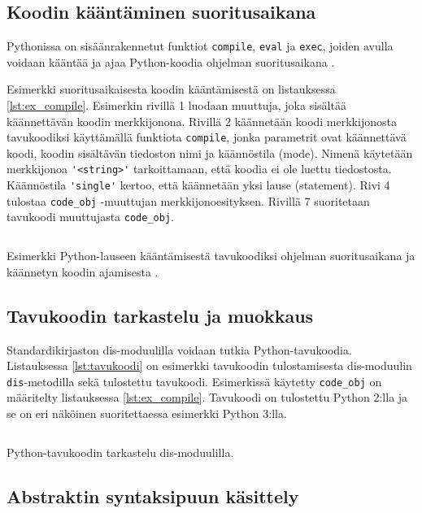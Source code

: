 \documentclass[finnish]{tktltiki2}
\theoremstyle{definition}
\theoremstyle{remark}
\begin{document}
\subsection{Koodin kääntäminen suoritusaikana}

Pythonissa on sisäänrakennetut funktiot \verb|compile|, \verb|eval| ja \verb|exec|, joiden avulla voidaan kääntää ja ajaa Python-koodia ohjelman suoritusaikana \cite{codeobjects}.

Esimerkki suoritusaikaisesta koodin kääntämisestä on listauksessa \ref{lst:ex_compile}. Esimerkin rivillä 1 luodaan muuttuja, joka sisältää käännettävän koodin merkkijonona. Rivillä 2 käännetään koodi merkkijonosta tavukoodiksi käyttämällä funktiota \verb|compile|, jonka parametrit ovat käännettävä koodi, koodin sisältävän tiedoston nimi ja käännöstila (mode). Nimenä käytetään merkkijonoa \verb|'<string>'| tarkoittamaan, että koodia ei ole luettu tiedostosta. Käännöstila \verb|'single'| kertoo, että käännetään yksi lause (statement). Rivi 4 tulostaa \verb|code_obj| -muuttujan merkkijonoesityksen. Rivillä 7 suoritetaan tavukoodi muuttujasta \verb|code_obj|.

\begin{listing}[htb!]
    \inputminted[linenos,frame=single,framesep=10pt]{python}{code/dynamichello.py}
    \caption{Esimerkki Python-lauseen kääntämisestä tavukoodiksi ohjelman suoritusaikana ja käännetyn koodin ajamisesta \cite{codeobjects}.}
    \label{lst:ex_compile}
\end{listing}


\subsection{Tavukoodin tarkastelu ja muokkaus}

Standardikirjaston dis-moduulilla voidaan tutkia Python-tavukoodia. Listauksessa \ref{lst:tavukoodi} on esimerkki tavukoodin tulostamisesta dis-moduulin \verb|dis|-metodilla sekä tulostettu tavukoodi. Esimerkissä käytetty \verb|code_obj| on määritelty listauksessa \ref{lst:ex_compile}. Tavukoodi on tulostettu Python 2:lla ja se on eri näköinen suoritettaessa esimerkki Python 3:lla.

\begin{listing}[htb!]
    \inputminted[linenos,frame=single,framesep=10pt]{python}{code/tavukoodi.py}
    \caption{Python-tavukoodin tarkastelu dis-moduulilla.}
    \label{lst:tavukoodi}
\end{listing}

\subsection{Abstraktin syntaksipuun käsittely}
\end{document}
